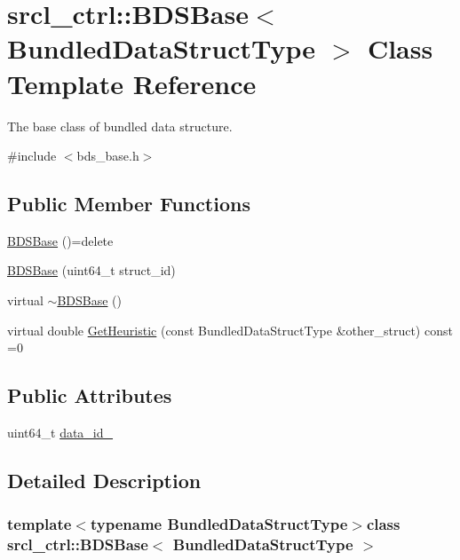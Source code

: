 \hypertarget{classsrcl__ctrl_1_1BDSBase}{\section{srcl\-\_\-ctrl\-:\-:B\-D\-S\-Base$<$ Bundled\-Data\-Struct\-Type $>$ Class Template Reference}
\label{classsrcl__ctrl_1_1BDSBase}
}


The base class of bundled data structure.  




{\ttfamily \#include $<$bds\-\_\-base.\-h$>$}

\subsection*{Public Member Functions}
\begin{DoxyCompactItemize}
\item 
\hyperlink{classsrcl__ctrl_1_1BDSBase_ae7b1111a923f60cf175d7eaeace58e03}{B\-D\-S\-Base} ()=delete
\item 
\hyperlink{classsrcl__ctrl_1_1BDSBase_abbd4520afa6946d298f43a2bc8f684c2}{B\-D\-S\-Base} (uint64\-\_\-t struct\-\_\-id)
\item 
virtual \hyperlink{classsrcl__ctrl_1_1BDSBase_adc1034cd10d22699b87e0f4d840ac591}{$\sim$\-B\-D\-S\-Base} ()
\item 
virtual double \hyperlink{classsrcl__ctrl_1_1BDSBase_af4b9b160e24ac0b22c365243cb673c8b}{Get\-Heuristic} (const Bundled\-Data\-Struct\-Type \&other\-\_\-struct) const =0
\end{DoxyCompactItemize}
\subsection*{Public Attributes}
\begin{DoxyCompactItemize}
\item 
uint64\-\_\-t \hyperlink{classsrcl__ctrl_1_1BDSBase_a9d93e5eaafb909e03a05c14ad31a77a7}{data\-\_\-id\-\_\-}
\end{DoxyCompactItemize}


\subsection{Detailed Description}
\subsubsection*{template$<$typename Bundled\-Data\-Struct\-Type$>$class srcl\-\_\-ctrl\-::\-B\-D\-S\-Base$<$ Bundled\-Data\-Struct\-Type $>$}

